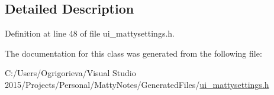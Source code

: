 \subsection{Detailed Description}


Definition at line 48 of file ui\+\_\+mattysettings.\+h.



The documentation for this class was generated from the following file\+:\begin{DoxyCompactItemize}
\item 
C\+:/\+Users/\+Ogrigorieva/\+Visual Studio 2015/\+Projects/\+Personal/\+Matty\+Notes/\+Generated\+Files/\hyperlink{ui__mattysettings_8h}{ui\+\_\+mattysettings.\+h}\end{DoxyCompactItemize}
